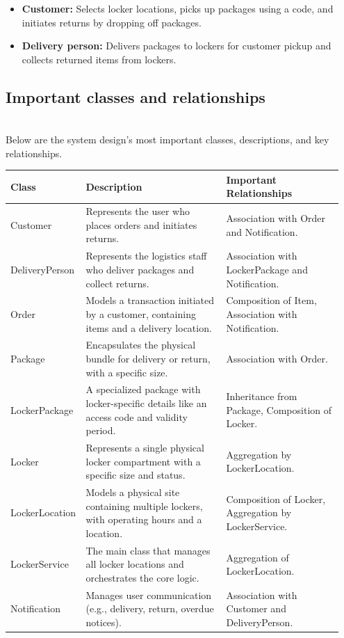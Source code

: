 \begin{itemize}
\item
\protect{}\label{rBQDw4jlarrt6b4haz8QR}
\textbf{Customer:} Selects locker locations, picks up packages using a code, and initiates returns by dropping off packages.
\item
\protect{}\label{N1H-8bC0jmQI7LkcrYNkR}
\textbf{Delivery person:} Delivers packages to lockers for customer pickup and collects returned items from lockers.
\end{itemize}

\subsection{Important classes and relationships}\label{d2OjqG3pp03E5-pIDSbOc}
\\
Below are the system design's most important classes, descriptions, and key relationships.

\begin{center}
\begin{tabular}{|p{0.18\linewidth}|p{0.42\linewidth}|p{0.35\linewidth}|}
\hline
\textbf{Class} & \textbf{Description} & \textbf{Important Relationships} \\
\hline
Customer & Represents the user who places orders and initiates returns. & Association with Order and Notification. \\
\hline
DeliveryPerson & Represents the logistics staff who deliver packages and collect returns. & Association with LockerPackage and Notification. \\
\hline
Order & Models a transaction initiated by a customer, containing items and a delivery location. & Composition of Item, Association with Notification. \\
\hline
Package & Encapsulates the physical bundle for delivery or return, with a specific size. & Association with Order. \\
\hline
LockerPackage & A specialized package with locker-specific details like an access code and validity period. & Inheritance from Package, Composition of Locker. \\
\hline
Locker & Represents a single physical locker compartment with a specific size and status. & Aggregation by LockerLocation. \\
\hline
LockerLocation & Models a physical site containing multiple lockers, with operating hours and a location. & Composition of Locker, Aggregation by LockerService. \\
\hline
LockerService & The main class that manages all locker locations and orchestrates the core logic. & Aggregation of LockerLocation. \\
\hline
Notification & Manages user communication (e.g., delivery, return, overdue notices). & Association with Customer and DeliveryPerson. \\
\hline
\end{tabular}
\end{center}


